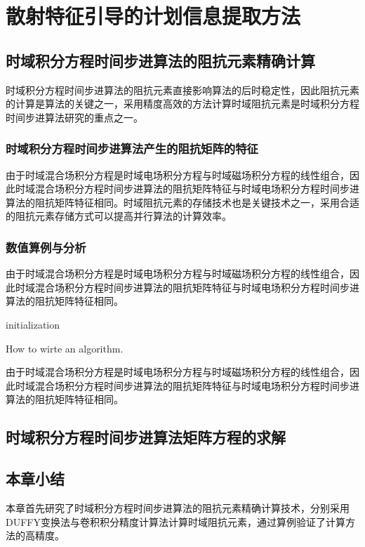 \documentclass[promaster]{thesis-uestc}
\begin{document}
\chapter{散射特征引导的计划信息提取方法}
\section{时域积分方程时间步进算法的阻抗元素精确计算}
时域积分方程时间步进算法的阻抗元素直接影响算法的后时稳定性，因此阻抗元素的计算是算法的关键之一，采用精度高效的方法计算时域阻抗元素是时域积分方程时间步进算法研究的重点之一。

\subsection{时域积分方程时间步进算法产生的阻抗矩阵的特征}
由于时域混合场积分方程是时域电场积分方程与时域磁场积分方程的线性组合，因此时域混合场积分方程时间步进算法的阻抗矩阵特征与时域电场积分方程时间步进算法的阻抗矩阵特征相同。时域阻抗元素的存储技术也是关键技术之一，采用合适的阻抗元素存储方式可以提高并行算法的计算效率。

\subsection{数值算例与分析}
由于时域混合场积分方程是时域电场积分方程与时域磁场积分方程的线性组合，因此时域混合场积分方程时间步进算法的阻抗矩阵特征与时域电场积分方程时间步进算法的阻抗矩阵特征相同。

\begin{algorithm}[H]
    initialization\;
    \caption{How to wirte an algorithm.}
\end{algorithm}

由于时域混合场积分方程是时域电场积分方程与时域磁场积分方程的线性组合，因此时域混合场积分方程时间步进算法的阻抗矩阵特征与时域电场积分方程时间步进算法的阻抗矩阵特征相同。

\section{时域积分方程时间步进算法矩阵方程的求解}

\section{本章小结}
本章首先研究了时域积分方程时间步进算法的阻抗元素精确计算技术，分别采用DUFFY变换法与卷积积分精度计算法计算时域阻抗元素，通过算例验证了计算方法的高精度。
\end{document}
